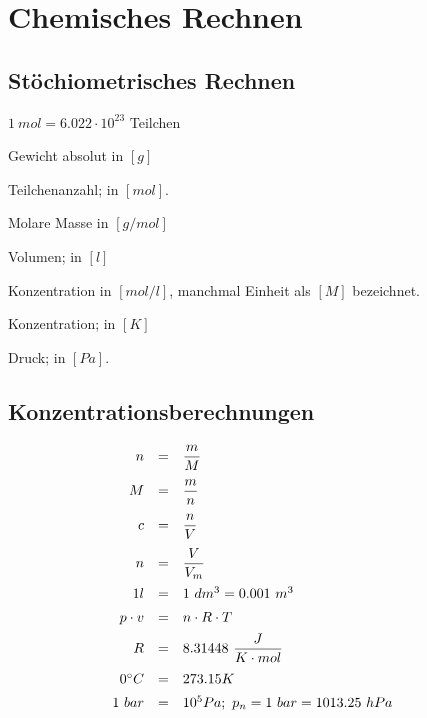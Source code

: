 \section{Chemisches Rechnen}

\subsection{Stöchiometrisches Rechnen}

\begin{definition}[mol]
	$1 \ mol = 6.022 \cdot 10^{23}$ Teilchen
\end{definition}

\begin{definition}[m]
	Gewicht absolut in $[g]$
\end{definition}

\begin{definition}[n]
	Teilchenanzahl; in $[mol]$.
\end{definition}

\begin{definition}[M]
	Molare Masse in $[g/mol]$
\end{definition}

\begin{definition}[V]
	Volumen; in	$[l]$
\end{definition}

\begin{definition}[c]
	Konzentration in $[mol/l]$, manchmal Einheit als $[M]$ bezeichnet.
\end{definition}

\begin{definition}[T]
	Konzentration; in $[K]$
\end{definition}

\begin{definition}[p]
	Druck; in $[Pa]$.
\end{definition}


\subsection{Konzentrationsberechnungen}

{\large
	
$$
\begin{array}{rcll}
n                & = & \dfrac{m}{M}           &\\[1em]
M                & = & \dfrac{m}{n}    &\\[1em]
c                 & = & \dfrac{n}{V} &\\[1em]
n                 & = &\dfrac{V}{V_m}             &\\[1em]
1l                & = & 1\ dm^3=0.001\ m^3         &\\[0.5em]
p \cdot v    & = & n \cdot R \cdot T                       &\\[0.5em]
R                & = & 8.31448 \ \dfrac{J}{K \cdot mol}  &\\[1em]
0\degree C & = & 273.15K             &\\[0.5em]
1\ bar         & = & 10^5 Pa; \ p_{n} = 1\ bar = 1013.25\ hPa & 
\end{array}
$$

}